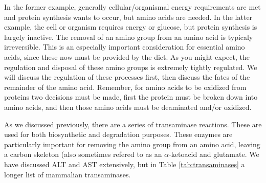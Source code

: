 \documentclass{tufte-handout}
\begin{document}
In the former example, generally cellular/organismal energy requirements are met and protein synthesis wants to occur, but amino acids are needed.  In the latter example, the cell or organism requires energy or glucose, but protein synthesis is largely inactive.  The removal of an amino group from an amino acid is typicaly irreversible.  This is an especially important consideration for essential amino acids, since these now must be provided by the diet.  As you might expect, the regulation and disposal of these amino groups is extremely tightly regulated.  We will discuss the regulation of these processes first, then discuss the fates of the remainder of the amino acid.  Remember, for amino acids to be oxidized from proteins two decisions must be made, first the protein must be broken down into amino acids, and then those amino acids must be deaminated and/or oxidized.


  As we discussed previously, there are a series of transaminase reactions.  These are used for both biosynthetic and degradation purposes.  These enzymes are particularly important for removing the amino group from an amino acid, leaving a carbon skeleton (also sometimes refered to as an $\alpha$-ketoacid and glutamate.  We have discussed ALT and AST extensively, but in Table \ref{tab:transaminases} a longer list of mammalian transaminases.
\end{document}
